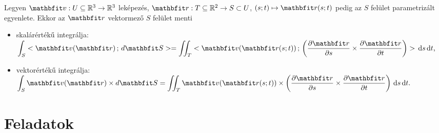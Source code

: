 \documentclass[lang=magyar]{math-handout}
\begin{document}
\vfill

\begin{definition}
  Legyen $\rvec v:  U \subseteq \mathbb R^3 \rightarrow \mathbb R^3$ leképezés,
  $\rvec r: T \subseteq \mathbb R^2 \rightarrow S \subset U$, $(s;t) \mapsto
    \rvec r(s;t)$ pedig az $S$ felület parametrizált egyenlete. Ekkor az
  $\rvec r$ vektormező $S$ felület menti
  \begin{itemize}
    \item skalárértékű integrálja:
          \(
            \displaystyle
            \int_S \scalar{\rvec v (\rvec r)}{d \rvec S} =
            \iint_T \scalar
            {\rvec v (\rvec r(s; t))}
            {\left(\pdv{\rvec r}{s} \times \pdv{\rvec r}{t}\right)}
            \, \diff s \, \diff t
            \text,
          \)
    \item vektorértékű integrálja:
          \(
            \displaystyle
            \int_S \rvec v (\rvec r) \times d \rvec S =
            \iint_T {\rvec v (\rvec r(s; t))} \times
            \left(\pdv{\rvec r}{s} \times \pdv{\rvec r}{t}\right)
            \, \diff s \, \diff t
            \text.
          \)

  \end{itemize}
\end{definition}

\clearpage
\section{Feladatok}
\end{document}
